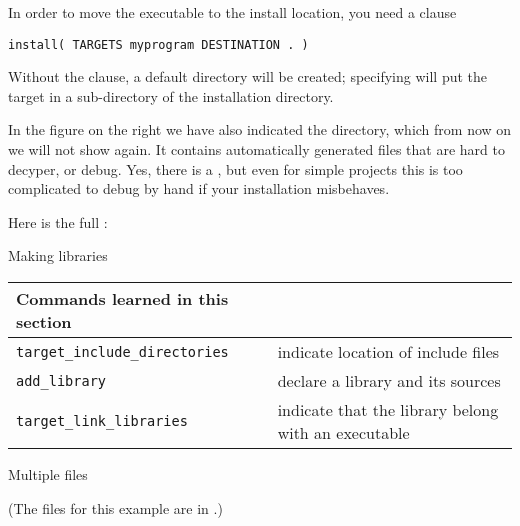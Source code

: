 In order to move the executable to the install location,
you need a clause
\begin{lstlisting}
install( TARGETS myprogram DESTINATION . )
\end{lstlisting}
Without the  clause, a default  directory
will be created; specifying  will put the
target in a  sub-directory of the installation directory.

\begin{floatingfigure}[r]{2.5in}\begin{minipage}{2.5in}\hbox{}\vskip 4in\hbox{}\end{minipage}\end{floatingfigure}%
%
In the figure on the right we have also indicated the  directory,
which from now on we will not show again.
It contains automatically generated files that are hard to
decyper, or debug. Yes, there is a , but even for simple
projects this is too complicated to debug by hand if your 
installation misbehaves.

Here is the full :
%


\newpage
{} {Making libraries}

\begin{tabular}{lp{3in}}
  \toprule
  Commands learned in this section\\
  \midrule
  \lstinline+target_include_directories+&indicate location of include files\\
  \lstinline+add_library+&declare a library and its sources\\
  \lstinline+target_link_libraries+&indicate that the library belong with an executable\\
  \bottomrule
\end{tabular}

 {Multiple files}

(The files for this example are in .)

